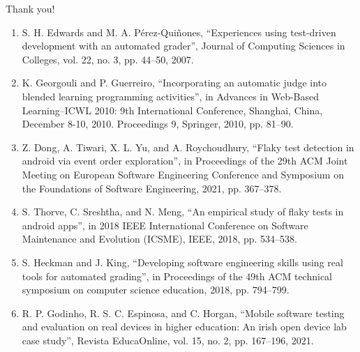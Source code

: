 \documentclass{beamer}%
\begin{document}

\begin{frame}{ }
\footnotesize

\begin{minipage}[t][0.8715\textheight]{\linewidth}
\begin{center}
Thank you! \vspace{1.5ex}
\end{center}

\scriptsize
\begin{enumerate}

\item<1->[[8\text{]}] S. H. Edwards and M. A. Pérez-Quiñones, “Experiences using test-driven development with an automated grader”, Journal of Computing Sciences in Colleges, vol. 22, no. 3, pp. 44–50, 2007.
\item<1->[[9\text{]}] K. Georgouli and P. Guerreiro, “Incorporating an automatic judge into blended learning programming activities”, in Advances in Web-Based Learning–ICWL 2010: 9th International Conference, Shanghai, China, December 8-10, 2010. Proceedings 9, Springer, 2010, pp. 81–90.
\item<1->[[10\text{]}]Z. Dong, A. Tiwari, X. L. Yu, and A. Roychoudhury, “Flaky test detection in android via event order exploration”, in Proceedings of the 29th ACM Joint Meeting on European Software Engineering Conference and Symposium on the Foundations of Software Engineering, 2021, pp. 367–378.
\item<1->[[11\text{]}] S. Thorve, C. Sreshtha, and N. Meng, “An empirical study of flaky tests in android apps”, in 2018 IEEE International Conference on Software Maintenance and Evolution (ICSME), IEEE, 2018, pp. 534–538.
\item<1->[[12\text{]}] S. Heckman and J. King, “Developing software engineering skills using real tools for automated grading”, in Proceedings of the 49th ACM technical symposium on computer science education, 2018, pp. 794–799.
\item<1->[[13\text{]}] R. P. Godinho, R. S. C. Espinosa, and C. Horgan, “Mobile software testing and evaluation on real devices in higher education: An irish open device lab case study”, Revista EducaOnline, vol. 15, no. 2, pp. 167–196, 2021.


\end{enumerate}


\vspace{3ex}%
\end{minipage}



\end{frame}
\end{document}
